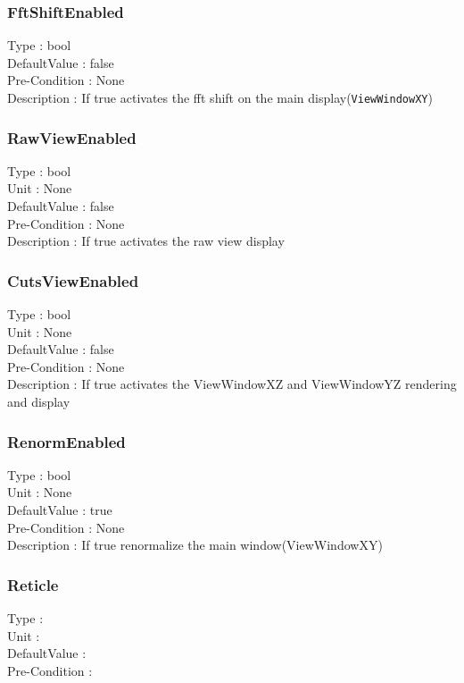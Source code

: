 \subsubsection{FftShiftEnabled}
\noindent
Type : bool\\
DefaultValue : false\\
Pre-Condition : None\\
Description : If true activates the fft shift on the main display(\verb|ViewWindowXY|)\\

\subsubsection{RawViewEnabled}
\noindent
Type : bool\\
Unit : None \\
DefaultValue : false\\
Pre-Condition : None\\
Description : If true activates the raw view display\\

\subsubsection{CutsViewEnabled}
\noindent
Type : bool\\
Unit : None \\
DefaultValue : false\\
Pre-Condition : None\\
Description : If true activates the ViewWindowXZ and ViewWindowYZ rendering and display\\

\subsubsection{RenormEnabled}
\noindent
Type : bool\\
Unit : None \\
DefaultValue : true\\
Pre-Condition : None\\
Description : If true renormalize the main window(ViewWindowXY)\\

\subsubsection{Reticle}
\noindent
Type : \\
Unit : \\
DefaultValue : \\
Pre-Condition : \\


